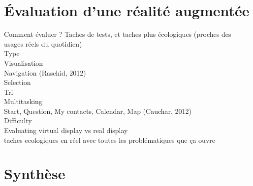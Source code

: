 \section*{Évaluation d'une réalité augmentée}
Comment évaluer ? Taches de tests, et taches plus écologiques (proches des usages réels du quotidien) \cite{DuenserGrassetBillinghurst2008} \cite{DeSaChurchill2013} \\
    Type \\
        Visualisation \\
        Navigation \cite{EnsFinneganIrani2014} (Raschid, 2012) \\
        Selection \cite{EnsFinneganIrani2014} \\
        Tri \cite{RobertsonCzerwinskiLarsonEtAl1998} \\
        Multitasking \\
            Start, Question, My contacts, Calendar, Map (Cauchar, 2012) \cite{EnsFinneganIrani2014} \\
    Difficulty \\

    Evaluating virtual display vs real display \\ 

    taches ecologiques en réel avec toutes les problématiques que ça ouvre \cite{KoelleKranzMoeller2015} \cite{DenningDehlawiKohno2014}



\section*{Synthèse}
